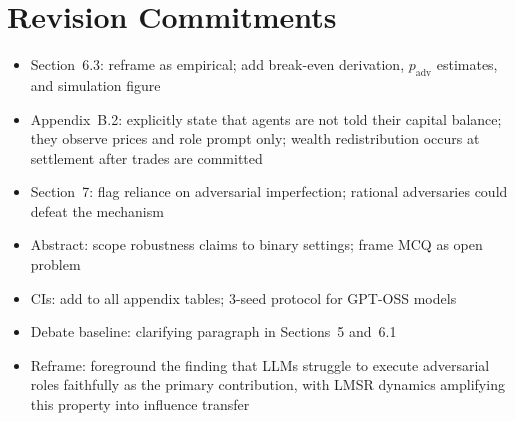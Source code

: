 \documentclass[10pt]{article}
\begin{document}
\section*{Revision Commitments}

\begin{itemize}[noitemsep,topsep=2pt,leftmargin=*]
  \item Section~6.3: reframe as empirical; add break-even derivation,
        $p_\text{adv}$ estimates, and simulation figure
  \item Appendix~B.2: explicitly state that agents are not told their capital
        balance; they observe prices and role prompt only; wealth redistribution
        occurs at settlement after trades are committed
  \item Section~7: flag reliance on adversarial imperfection; rational
        adversaries could defeat the mechanism
  \item Abstract: scope robustness claims to binary settings; frame MCQ as
        open problem
  \item CIs: add to all appendix tables; 3-seed protocol for GPT-OSS models
  \item Debate baseline: clarifying paragraph in Sections~5 and~6.1
  \item Reframe: foreground the finding that LLMs struggle to execute
        adversarial roles faithfully as the primary contribution, with LMSR
        dynamics amplifying this property into influence transfer
\end{itemize}
\end{document}
